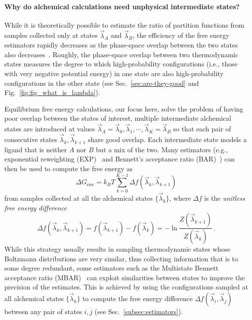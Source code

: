 \documentclass[9pt,bestpractices]{livecoms}
\begin{document}
\paragraph{Why do alchemical calculations need unphysical intermediate states?}
While it is theoretically possible to estimate the ratio of partition functions from samples collected only at states $\vec{\lambda}_A$ and $\vec{\lambda}_B$, the efficiency of the free energy estimators rapidly decreases as the phase-space overlap between the two states also decreases~\cite{wu2005phasespaceb,wu2005phasespacec}.
Roughly, the phase-space overlap between two thermodynamic states measures the degree to which high-probability configurations (i.e., those with very negative potential energy) in one state are also high-probability configurations in the other state (see Sec.~\ref{sec:are-they-good} and Fig.~\ref{fig:fig_what_is_lambda}).

Equilibrium free energy calculations, our focus here, solve the problem of having poor overlap between the states of interest, multiple intermediate alchemical states are introduced at values $\vec{\lambda}_A = \vec{\lambda}_0, \vec{\lambda}_1, \cdots, \vec{\lambda}_K = \vec{\lambda}_B$ so that each pair of consecutive states $\vec{\lambda}_k, \vec{\lambda}_{k+1}$ share good overlap.
Each intermediate state models a ligand that is neither $A$ nor $B$ but a mix of the two.
Many estimators (e.g., exponential reweighting (EXP)~\cite{zwanzig1954hightemperature} and Bennett's acceptance ratio (BAR)~\cite{bennett1976efficient,shirts2003equilibriuma}) can then be used to compute the free energy as
\begin{equation}
    \Delta G_{\mathrm{env}} = k_BT \sum_{k=0}^{K-1} \Delta f(\vec{\lambda}_k, \vec{\lambda}_{k+1})
\end{equation}
from samples collected at all the alchemical states $\{\vec{\lambda}_k \}$, where $\Delta f$ is the \emph{unitless free energy difference}
\begin{equation}
    \Delta f(\vec{\lambda}_k, \vec{\lambda}_{k+1}) = f(\vec{\lambda}_{k+1}) - f(\vec{\lambda}_k) = - \ln \frac{Z(\vec{\lambda}_{k+1})}{Z(\vec{\lambda}_k)} \, .
\end{equation}
While this strategy usually results in sampling thermodynamic states whose Boltzmann distributions are very similar, thus collecting information that is to some degree redundant, some estimators such as the Multistate Bennett acceptance ratio (MBAR)~\cite{shirts2008statisticallya} can exploit similarities between states to improve the precision of the estimates. This is achieved by using the configurations sampled at all alchemical states $\{\vec{\lambda}_k \}$ to compute the free energy difference $\Delta f(\vec{\lambda}_i, \vec{\lambda}_{j})$ between any pair of states $i,j$ (see Sec.~\ref{subsec:estimators}).
\end{document}
